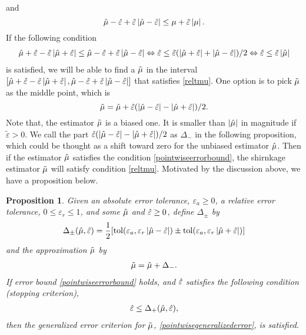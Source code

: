 \documentclass{iitthesis}
\newtheorem{proposition}[theorem]{Proposition}
\theoremstyle{definition}
\begin{document}
and 
$$\hat{\mu}-\hat{\varepsilon}+\tilde{\varepsilon}\left \lvert \hat{\mu}-\hat{\varepsilon} \right \rvert \leq \mu+\tilde{\varepsilon}\left \lvert \mu \right \rvert.$$
If the following condition 
\begin{align}\label{hmuhepscondition2}
\hat{\mu}+\hat{\varepsilon}-\tilde{\varepsilon}\left \lvert \hat{\mu}+\hat{\varepsilon} \right \rvert \leq \hat{\mu}-\hat{\varepsilon}+\tilde{\varepsilon}\left \lvert \hat{\mu}-\hat{\varepsilon} \right \rvert \Leftrightarrow \hat{\varepsilon} \leq \tilde{\varepsilon}(\left \lvert \hat{\mu}+\hat{\varepsilon} \right \rvert +\left \lvert \hat{\mu}-\hat{\varepsilon} \right \rvert)/2 \Leftrightarrow \hat{\varepsilon} \leq \tilde{\varepsilon} \left \lvert \hat{\mu} \right \rvert
\end{align}
is satisfied, 
we will be able to find a $\tilde{\mu}$ in the interval
$[\hat{\mu}+\hat{\varepsilon}-\tilde{\varepsilon}\left \lvert \hat{\mu}+\hat{\varepsilon} \right \rvert, \hat{\mu}-\hat{\varepsilon}+\tilde{\varepsilon}\left \lvert \hat{\mu}-\hat{\varepsilon} \right \rvert]$ that satisfies \eqref{reltmu}. One option is to pick $\tilde{\mu}$ as the middle point, which is
 $$\tilde{\mu} = \hat{\mu} +\tilde{\varepsilon} (\left \lvert \hat{\mu}-\hat{\varepsilon} \right \rvert-\left \lvert \hat{\mu}+\hat{\varepsilon} \right \rvert)/2.$$
Note that, the estimator $\tilde{\mu}$ is a biased one. It is smaller than $\left \lvert \hat{\mu} \right \rvert$ in magnitude if $\tilde{\varepsilon}>0$. We call the part $\tilde{\varepsilon} (\left \lvert \hat{\mu}-\hat{\varepsilon} \right \rvert-\left \lvert \hat{\mu}+\hat{\varepsilon} \right \rvert)/2$  as $\Delta_-$ in the following proposition, which could be thought as a shift toward zero for the unbiased estimator $\hat{\mu}$.  Then if the estimator $\hat{\mu}$ satisfies the condition \eqref{pointwiseerrorbound}, the shirnkage estimator $\tilde{\mu}$ will satisfy condition \eqref{reltmu}. Motivated by the discussion above, we have a proposition below.
\begin{proposition}\label{meanMCgProp}
Given an absolute error tolerance, $\varepsilon_a\geq 0$, a relative error tolerance, $0 \leq \varepsilon_r\le 1$, and some $\hat{\mu}$ and $\hat{\varepsilon}\geq 0$, define $\Delta_\pm$ by
\begin{align}\Delta_{\pm}(\hat{\mu},\hat{\varepsilon}) = \frac{1}{2} [\operatorname{tol}(\varepsilon_a, \varepsilon_r \left \lvert \hat{\mu}-\hat{\varepsilon} \right \rvert) \pm \operatorname{tol}(\varepsilon_a, \varepsilon_r \left \lvert \hat{\mu}+\hat{\varepsilon} \right \rvert)] \label{deltadef}
\end{align}
and the approximation $\tilde{\mu}$ by
\begin{align}
\tilde{\mu} = \hat{\mu} + \Delta_{-}. \label{appxsol}
\end{align}
If error bound \eqref{pointwiseerrorbound} holds, and $\hat{\varepsilon}$ satisfies the following condition (stopping criterion),
\begin{align}
\hat{\varepsilon}\leq \Delta_{+}(\hat{\mu},\hat{\varepsilon}),\label{deltacondition}
\end{align}
 then the generalized error criterion for $\tilde{\mu}$, \eqref{pointwisegeneralizederror}, is satisfied. 
 \end{proposition}
\end{document}
